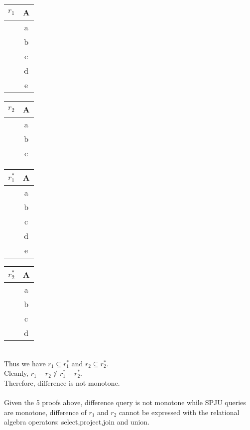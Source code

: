 \documentclass{article}
\begin{document}
\begin{table}[htbp]
\begin{minipage}{.3\linewidth}
\centering
\begin{tabular}{|c|c|}
\hline 
$r_{1}$ &  A \\
\hline
& a  \\
& b  \\
& c  \\
& d  \\
& e  \\
\hline 
\end{tabular}
\end{minipage}\begin{minipage}{.3\linewidth}  
\centering
\begin{tabular}{|c|c|}
\hline 
$r_{2}$ & A \\
\hline
& a  \\
& b  \\
& c  \\
\hline 
\end{tabular}
\end{minipage}\begin{minipage}{.3\linewidth}
\centering
\begin{tabular}{|c|c|}
\hline
$r_{1}^{*}$ & A \\
\hline
& a  \\
& b  \\
& c  \\
& d  \\
& e  \\
\hline
\end{tabular}
\end{minipage}\begin{minipage}{.3\linewidth}
\centering
\begin{tabular}{|c|c|}
\hline
$r_{2}^{*}$ & A \\
\hline
& a  \\
& b  \\
& c  \\
& d  \\
\hline
\end{tabular}
\end{minipage}

\end{table}
\\
Thus we have $r_{1}\subseteq r_{1}^{*}$ and $r_{2}\subseteq r_{2}^{*}$.\\
Cleanly, $r_{1}-r_{2}\notin r_{1}^{*}-r_{2}^{*}$.\\
Therefore, difference is not monotone.\\
\\
Given the 5 proofs above, difference query is not monotone while SPJU queries are monotone, difference of $r_{1}$ and $r_{2}$ cannot be expressed with the relational algebra operators: select,project,join and union.
\end{document}
